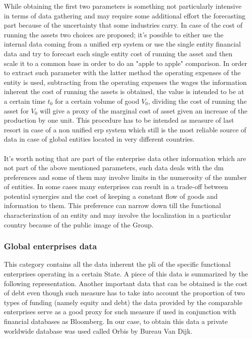 \begin{doublespace}
While obtaining the first two parameters is something not particularly intensive in terms of data gathering and may require some additional effort the forecasting part because of the uncertainty that some industries carry. In case of the cost of running the assets two choices are proposed; it's possible to either use the internal data coming from a unified \gls{erp} system or use the single entity financial data and try to forecast each single entity cost of running the asset and then scale it to a common base in order to do an "apple to apple" comparison. In order to extract such parameter with the latter method the  operating expenses of the entity\cite{Williams2008} is used, subtracting from the operating expenses the wages the information inherent the cost of running the assets is obtained, the value is intended to be at a certain time $t_0$ for a certain volume of good $V_0$, dividing the cost of running the asset for $V_0$ will give a proxy of the marginal cost of asset given an increase of the production by one unit. This procedure has to be intended as measure of last resort in case of a non unified \gls{erp} system which still is the most reliable source of data in case of global entities located in very different countries. 
\\
\\
It's worth noting that are part of the enterprise data other information which are not part of the above mentioned parameters, such data deals with the \gls{dm} preferences and some of them may involve limits in the numerosity of the number of entities. In some cases many enterprises can result in a trade-off between potential synergies and the cost of keeping a constant flow of goods and information to them. This preference can narrow down till the functional characterization of an entity and may involve the localization in a particular country because of the public image of the Group.

\subsubsection{Global enterprises data}
This category contains all the data inherent the \gls{pli} of the specific functional enterprises operating in a certain State.
A piece of this data is summarized by the following representation. Another important data that can be obtained is the cost of debt \cite{Berman2013} even though such measure has to take into account the proportion of two types of funding (namely equity and debt) the data provided by the comparable enterprises serve as a good proxy for such measure if used in conjunction with financial databases as Bloomberg. In our case, to obtain this data a private worldwide database was used called Orbis by Bureau Van Dijk.


\end{doublespace}
